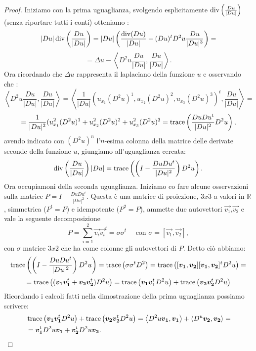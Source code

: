 \begin{proof}
Iniziamo con la prima uguaglianza, svolgendo esplicitamente $\operatorname{div}\left(\frac{Du}{|Du|}\right)$ (senza riportare tutti i conti) otteniamo :
\[
|Du|\operatorname{div}\left(\frac{Du}{|Du|}\right)=|Du|\left(\frac{\operatorname{div}(Du)}{|Du|} -(Du)^tD^2u\frac{Du}{|Du|^3}\right) =
\]
\[
= \Delta u - \left<D^2u\frac{Du}{|Du|},\frac{Du}{|Du|}\right> .
\]
Ora ricordando che $\Delta u$ rappresenta il laplaciano della funzione $u$ e osservando che :
\[
\left<D^2u\frac{Du}{|Du|},\frac{Du}{|Du|}\right> = \left<\frac{1}{|Du|}(u_{x_1}(D^2u)^1,u_{x_2}(D^2u)^2,u_{x_3}(D^2u)^3)^t,\frac{Du}{|Du|}\right> =
\]
\[
=\frac{1}{|Du|^2}(u_{x_1}^2(D^2u)^1+u_{x_2}^2(D^2u)^2+u_{x_3}^2(D^2u)^3 = \operatorname{trace}\left(\frac{DuDu^t}{|Du|^2}D^2u\right),
\]
avendo indicato con $(D^2u)^n$ l'$n$-esima colonna della matrice delle derivate seconde della funzione $u$, giungiamo all'uguaglianza cercata:
\[
\operatorname{div}\left(\frac{Du}{|Du|}\right)|Du| = \operatorname{trace}\left(\left(I-{\frac{DuDu^t}{|Du|^2}}\right)D^2u\right).
\] 
Ora occupiamoni della seconda uguaglianza. Iniziamo co fare alcune osservazioni sulla matrice $P=I-\frac{DuDu^t}{|Du|^2}$. Questa è una matrice di proiezione, $3x3$ a valori in $\mathbb{R}$, simmetrica ($P^t=P$) e idempotente ($P^2=P$), ammette due autovettori $\vec{v_1}$,$\vec{v_2}$ e vale la seguente decomposizione
\[
P=\sum_{i=1}^2\vec{v_i}\vec{v_i}^t=\sigma\sigma^t\quad\text{ con } \sigma=[\vec{v_1},\vec{v_2}],
\]
con $\sigma$ matrice $3x2$ che ha come colonne gli autovettori di $P$. Detto ciò abbiamo: 
\[
\operatorname{trace}\left(\left(I-{\frac{DuDu^t}{|Du|^2}}\right)D^2u\right)=\operatorname{trace}\left(\sigma\sigma^tD^2\right)=\operatorname{trace}\left([\bm{v_1},\bm{v_2}][\bm{v_1},\bm{v_2}]^tD^2u\right)=
\]
\[
=\operatorname{trace}\left((\bm{v_1}\bm{v_1}^t+\bm{v_2}\bm{v_2}^t)D^2u\right)=\operatorname{trace}\left(\bm{v_1}\bm{v_1}^tD^2u\right)+\operatorname{trace}\left(\bm{v_2}\bm{v_2}^tD^2u\right)
\]
Ricordando i calcoli fatti nella dimostrazione della prima uguaglianza possiamo scrivere:
\[
\begin{split}
&\operatorname{trace}\left(\bm{v_1}\bm{v_1}^tD^2u\right)+\operatorname{trace}\left(\bm{v_2}\bm{v_2}^tD^2u\right)=\left<D^2u\bm{v_1},\bm{v_1}\right>+\left<D^u\bm{v_2},\bm{v_2}\right>=\\
& =\bm{v_1}^tD^2u\bm{v_1}+\bm{v_2}^tD^2u\bm{v_2}.
\end{split}
\]
\end{proof}
